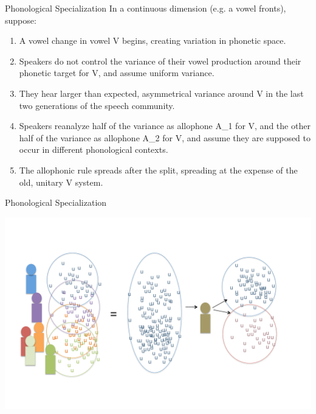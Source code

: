 \documentclass[hyperref={pdfpagelabels=false}]{beamer}
\begin{document}
\begin{frame}{Phonological Specialization}
	In a continuous dimension (e.g. a vowel fronts), suppose: \pause
	\begin{enumerate}
		\item A vowel change in vowel V begins, creating variation in phonetic space. \pause
		\item Speakers do not control the variance of their vowel production around their phonetic target for V, and assume uniform variance.
		\item They hear larger than expected, asymmetrical variance around V in the last two generations of the speech community.
		\item Speakers reanalyze half of the variance as allophone A_1 for V, and the other half of the variance as allophone A_2 for V, and assume they are supposed to occur in different phonological contexts.
		\item The allophonic rule spreads after the split, spreading at the expense of the old, unitary V system.

	\end{enumerate}

\end{frame}

\begin{frame}{Phonological Specialization}
	\begin{center}
	\includegraphics[trim=2cm 2cm 2cm 2cm, clip=false, width=.85\textwidth]{diavariance.pdf}
	\end{center}
\end{frame}
\end{document}

